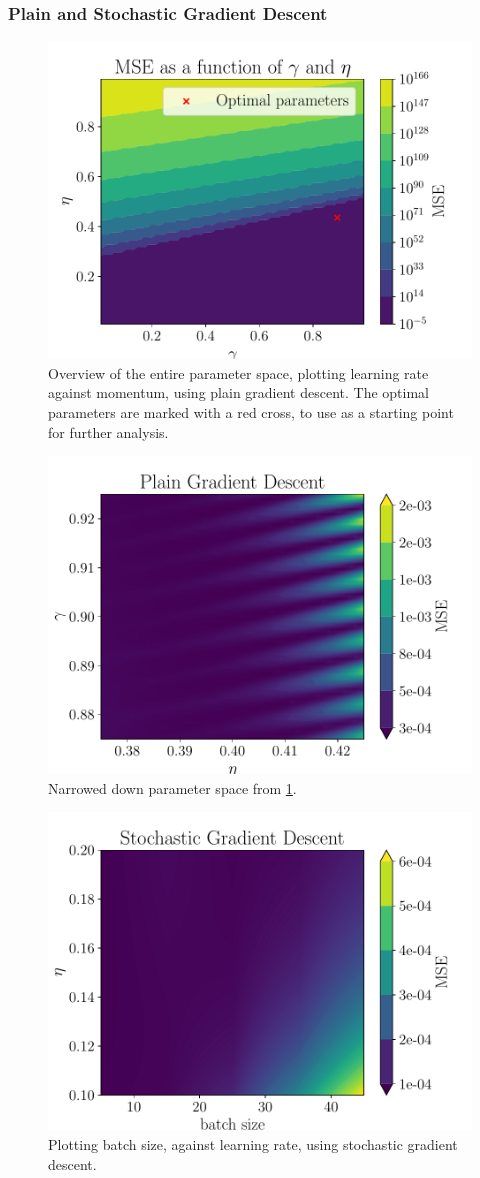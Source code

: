 \documentclass[aps,pra,english,notitlepage,reprint,nofootinbib]{revtex4-1}  %
\begin{document}
\subsubsection{Plain and Stochastic Gradient Descent}
\begin{figure}[h!]
    \centering
    \includegraphics[width = .4\textwidth]{../figs/a_2_parameter_overview.pdf}
    \caption{Overview of the entire parameter space, plotting learning rate against momentum,  using plain gradient descent. The optimal parameters are marked with a red cross, to use as a starting point for further analysis.}
    \label{fig: param_overview}
\end{figure}

\begin{figure}[h!]
    \centering
    \includegraphics[width = .4\textwidth]{../figs/GD_eta_gamma.pdf}
    \caption{Narrowed down parameter space from \cref{fig: param_overview}.}
    \label{fig: param_narrowed}
\end{figure}

\begin{figure}[ht!]
    \centering
    \includegraphics[width = .4\textwidth]{../figs/SGD_batch_eta_.pdf}
    \caption{Plotting batch size, against learning rate, using stochastic gradient descent.}
    \label{fig: SGD_batch_eta}
\end{figure}
\end{document}
